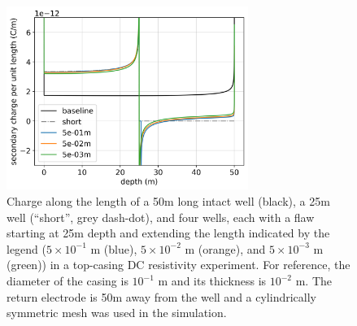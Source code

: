 \begin{figure}
    \begin{center}
    \includegraphics[width=0.7\textwidth]{figures/dc_casing/casing_charge_flawdz.png}
    \end{center}
\caption{
    Charge along the length of a 50m long intact well (black),
    a 25m well (``short'', grey dash-dot), and four wells, each with a flaw
    starting at 25m depth and extending the length indicated by the legend
    ($5 \times 10^{-1}$ m (blue), $5 \times 10^{-2}$ m (orange), and $5 \times 10^{-3}$ m (green))
    in a top-casing DC resistivity experiment.
    For reference, the diameter of the casing is $10^{-1}$ m and its thickness is $10^{-2}$ m.
    The return electrode
    is 50m away from the well and a cylindrically symmetric mesh was used in the simulation.
}
\label{fig:casing_charge_flawdz}
\end{figure}

